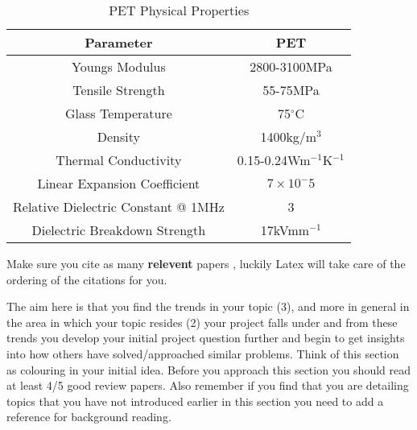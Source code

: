 \begin{table}[ht]
	\centering
		\begin{tabular}{ c  c  }
		\hline
		\hline
		Parameter & PET \\
		\hline
		Youngs Modulus & 2800-3100MPa \\
		Tensile Strength & 55-75MPa \\
		Glass Temperature & 75$^\circ$C \\
		Density & 1400kg/m$^3$ \\
		Thermal Conductivity & 0.15-0.24Wm$^{-1}$K$^{-1}$ \\
		Linear Expansion Coefficient & $7\times10^-5$ \\
		Relative Dielectric Constant @ 1MHz & 3\\
		Dielectric Breakdown Strength & 17kVmm$^{-1}$\\
		\end{tabular}
	\caption{PET Physical Properties}
	\label{tab:Mylar}
\end{table}

Make sure you cite\cite{Reference1} as many \textbf{relevent} papers \cite{Reference3}, luckily Latex will take care of the ordering of the citations \cite{Reference2} for you.

The aim here is that you find the trends in your topic (3), and more in general in the area in which your topic resides (2) your project falls under and from these trends you develop your initial project question further and begin to get insights into how others have solved/approached similar problems. Think of this section as colouring in your initial idea. Before you approach this section you should read at least 4/5 good review papers. Also remember if you find that you are detailing topics that you have not introduced earlier in this section you need to add a reference for background reading.